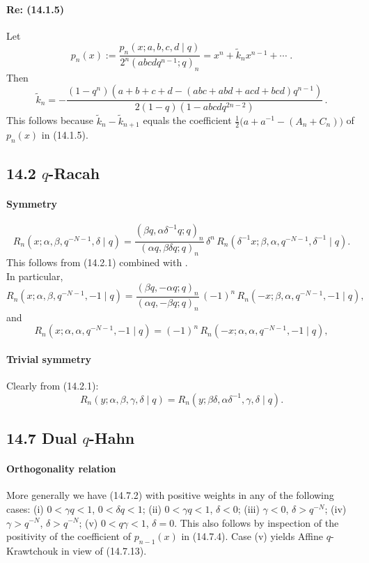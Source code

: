 \documentclass[twoside,11pt]{article}
\newcommand\sa{\smallskipamount}
\newcommand\sLP{\\[\sa]}
\newcommand\al\alpha
\newcommand\be\beta
\newcommand\ga\gamma
\newcommand\de\delta
\newcommand\thalf{\tfrac12}
\newcommand\wt{\widetilde}
\begin{document}
\paragraph{Re: (14.1.5)}
Let
\begin{equation}
p_n(x):=\frac{p_n(x;a,b,c,d\mid q)}{2^n(abcdq^{n-1};q)_n}=x^n+\wt k_n x^{n-1}
+\cdots\;.
\label{18}
\end{equation}
Then
\begin{equation}
\wt k_n=-\frac{(1-q^n)(a+b+c+d-(abc+abd+acd+bcd)q^{n-1})}
{2(1-q)(1-abcdq^{2n-2})}\,.
\label{19}
\end{equation}
This follows because $\tilde k_n-\tilde k_{n+1}$ equals the coefficient
$\thalf\bigl(a+a^{-1}-(A_n+C_n)\bigr)$ of $p_n(x)$ in (14.1.5).
%
\subsection*{14.2 $q$-Racah}
\paragraph{Symmetry}
\begin{equation}
R_n(x;\al,\be,q^{-N-1},\de\mid q)
=\frac{(\be q,\al\de^{-1}q;q)_n}{(\al q,\be\de q;q)_n}\,\de^n\,
R_n(\de^{-1}x;\be,\al,q^{-N-1},\de^{-1}\mid q).
\label{84}
\end{equation}
This follows from (14.2.1) combined with \cite[(III.15)]{GR}.
\sLP
In particular,
\begin{equation}
R_n(x;\al,\be,q^{-N-1},-1\mid q)
=\frac{(\be q,-\al q;q)_n}{(\al q,-\be q;q)_n}\,(-1)^n\,
R_n(-x;\be,\al,q^{-N-1},-1\mid q),
\label{85}
\end{equation}
and
\begin{equation}
R_n(x;\al,\al,q^{-N-1},-1\mid q)
=(-1)^n\,R_n(-x;\al,\al,q^{-N-1},-1\mid q),
\label{86}
\end{equation}

\paragraph{Trivial symmetry}
Clearly from (14.2.1):
\begin{equation}
R_n(y;\al,\be,\ga,\de\mid q)=R_n(y;\be\de,\al\de^{-1},\ga,\de\mid q).
\label{83}
\end{equation}
%
\subsection*{14.7 Dual $q$-Hahn}
\paragraph{Orthogonality relation}
More generally we have (14.7.2) with positive weights in any of the following
cases:
(i) $0<\ga q<1$, $0<\de q<1$;\quad
(ii) $0<\ga q<1$, $\de<0$;\quad
(iii) $\ga<0$, $\de>q^{-N}$;\quad
(iv) $\ga>q^{-N}$, $\de>q^{-N}$;\quad
(v) $0<q\ga<1$, $\de=0$.
This also follows by inspection of the positivity of the coefficient of
$p_{n-1}(x)$ in (14.7.4).
Case (v) yields Affine $q$-Krawtchouk in view of (14.7.13).
%
\end{document}
